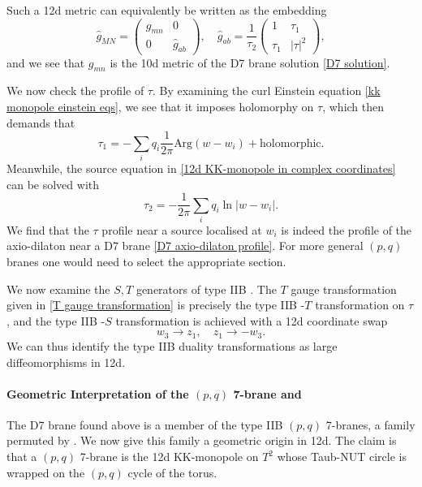 Such a 12d metric can equivalently be written as the embedding 
\begin{equation}
\widehat{g}_{MN} = 
\begin{pmatrix}
g_{mn} & 0\\
0 & \widehat{g}_{ab}
\end{pmatrix},\quad
\widehat{g}_{ab} = \frac{1}{\tau_2}\begin{pmatrix}
1 & \tau_1\\
\tau_1 & |\tau|^2
\end{pmatrix},
\end{equation}
and we see that $g_{mn}$ is the 10d metric of the D7 brane solution \eqref{D7 solution}.

We now check the profile of $\tau$.
By examining the curl Einstein equation \eqref{kk monopole einstein eqs}, we see that it imposes holomorphy on $\tau$, which then demands that
\begin{equation}
\tau_1= -\sum_i q_i \frac{1}{2\pi}\text{Arg}(w-w_i) + \text{holomorphic}.
\end{equation}
Meanwhile, the source equation in \eqref{12d KK-monopole in complex coordinates} can be solved with
\begin{equation}
\tau_2=-\frac{1}{2\pi}\sum_i q_i \ln |w-w_i|.
\end{equation}
We find that the $\tau$ profile near a source localised at $w_i$ is indeed the profile of the axio-dilaton near a D7 brane \eqref{D7 axio-dilaton profile}. 
For more general $(p,q)$ branes one would need to select the appropriate \SLZ{} section.

We now examine the $S,T$ generators of type IIB \SLZ{}.
The $T$ gauge transformation given in \eqref{T gauge transformation} is precisely the type IIB \SLZ{}-$T$ transformation on $\tau$, and the type IIB \SLZ{}-$S$ transformation is achieved with a 12d coordinate swap
\begin{equation}
w_3\to z_1, \quad
z_1\to -w_3 .
\end{equation}
We can thus identify the type IIB \SLZ{} duality transformations as large diffeomorphisms in 12d.

\paragraph{\boldmath Geometric Interpretation of the $(p,q)$ 7-brane and \SLZ{}}
\label{par:interpreting-sl2z}

The D7 brane found above is a member of the type IIB $(p,q)$ 7-branes, a family permuted by \SLZ{} \cite{Weigand:2018rez}. 
We now give this family a geometric origin in 12d. The claim is that a $(p,q)$ 7-brane is the 12d KK-monopole on $T^2$ whose Taub-NUT circle is wrapped on the $(p,q)$ cycle of the torus.

